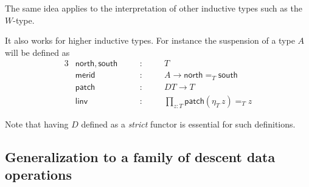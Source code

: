 \documentclass[10pt,a4paper,draft]{article}
\newcommand{\Nat}{\mathsf{Nat}}
\newcommand{\north}{\mathsf{north}}
\newcommand{\susp}{\mathop{\mathsf{Susp}}}
\newcommand{\south}{\mathsf{south}}
\newcommand{\merid}{\mathsf{merid}}
\newcommand{\patch}{\mathsf{patch}}
\newcommand{\leftinv}{\mathsf{linv}}
\newcommand{\zero}{\mathsf{zero}}
\newcommand{\SUCC}{\mathsf{succ}}
\newcommand{\D}{D}              %
\renewcommand{\~}{\widetilde}
\theoremstyle{definition}
\theoremstyle{remark} %
\begin{document}
The same idea
applies to the interpretation of other inductive types
such as the $W$\hyp{}type.

\medskip

It also works for higher inductive types. For instance
the suspension of a type $A$ will be defined as
\begin{alignat*}{3}
  & \north, \south    & \quad & : & \quad & T \\
  & \merid     & \quad & : & \quad & {A}\rightarrow \north =_{T} \south \\
  & \patch    & \quad & : & \quad & \D T \rightarrow T \\
  & \leftinv  & \quad & : & \quad & \textstyle\prod_{z : T} \patch (\eta_{T}\, z) =_{T} z
\end{alignat*}

Note that having $\D$ defined as a {\em strict} functor is essential for such definitions.

\subsection{Generalization to a family of descent data operations}\label{Suniv}
\end{document}
